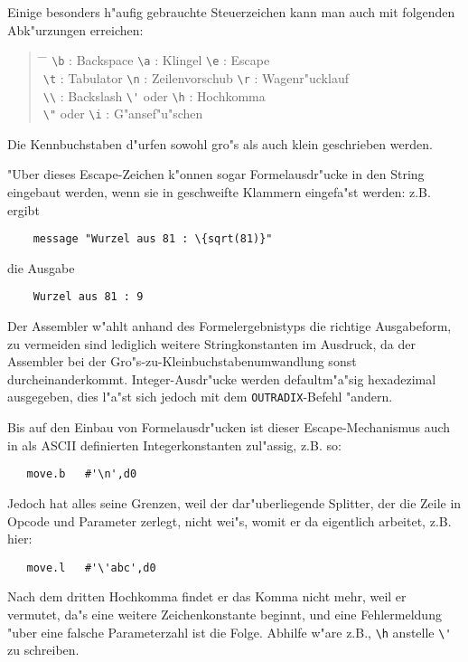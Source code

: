 \documentclass[12pt,a4paper,twoside]{report}
\newcommand{\tty}[1]{{\tt #1}}
\begin{document}
Einige besonders h"aufig gebrauchte Steuerzeichen kann man auch mit
folgenden Abk"urzungen erreichen:
\begin{quote}\begin{tabbing}
\hspace{4cm} \= \hspace{4cm} \= \kill
\verb!\b! : Backspace \> \verb!\a! : Klingel        \> \verb!\e! : Escape \\
\verb!\t! : Tabulator \> \verb!\n! : Zeilenvorschub \> \verb!\r! : Wagenr"ucklauf \\
\verb!\\! : Backslash \> \verb!\'! oder \verb!\h! : Hochkomma \\
\verb!\"! oder \verb!\i! : G"ansef"u"schen \\
\end{tabbing}\end{quote}
Die Kennbuchstaben d"urfen sowohl gro"s als auch klein geschrieben
werden.
\par
"Uber dieses Escape-Zeichen k"onnen sogar Formelausdr"ucke in den
String eingebaut werden, wenn sie in geschweifte Klammern eingefa"st
werden: z.B. ergibt
\begin{verbatim}
    message "Wurzel aus 81 : \{sqrt(81)}"
\end{verbatim}
die Ausgabe
\begin{verbatim}
    Wurzel aus 81 : 9
\end{verbatim}
Der Assembler w"ahlt anhand des Formelergebnistyps die richtige
Ausgabeform, zu vermeiden sind lediglich weitere Stringkonstanten
im Ausdruck, da der Assembler bei der Gro"s-zu-Kleinbuchstabenumwandlung
sonst durcheinanderkommt.  Integer-Ausdr"ucke werden defaultm"a"sig
hexadezimal ausgegeben, dies l"a"st sich jedoch mit dem
\tty{OUTRADIX}-Befehl "andern.
\par
Bis auf den Einbau von Formelausdr"ucken ist dieser Escape-Mechanismus
auch in als ASCII definierten Integerkonstanten zul"assig, z.B. so:
\begin{verbatim}
   move.b   #'\n',d0
\end{verbatim}
Jedoch hat alles seine Grenzen, weil der dar"uberliegende Splitter, der
die Zeile in Opcode und Parameter zerlegt, nicht wei"s, womit er da
eigentlich arbeitet, z.B. hier:
\begin{verbatim}
   move.l   #'\'abc',d0
\end{verbatim}
Nach dem dritten Hochkomma findet er das Komma nicht mehr, weil er
vermutet, da"s eine weitere Zeichenkonstante beginnt, und eine
Fehlermeldung "uber eine falsche Parameterzahl ist die Folge.  Abhilfe
w"are z.B., \verb!\h! anstelle \verb!\'! zu schreiben.
\end{document}
